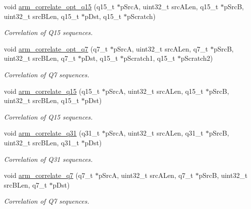 \begin{DoxyCompactItemize}
void \hyperlink{group__Corr_gad71c0ec70ec69edbc48563d9a5f68451}{arm\+\_\+correlate\+\_\+opt\+\_\+q15} (q15\+\_\+t $\ast$p\+SrcA, uint32\+\_\+t src\+A\+Len, q15\+\_\+t $\ast$p\+SrcB, uint32\+\_\+t src\+B\+Len, q15\+\_\+t $\ast$p\+Dst, q15\+\_\+t $\ast$p\+Scratch)
\begin{DoxyCompactList}\small\item\em Correlation of Q15 sequences. \end{DoxyCompactList}\item 
void \hyperlink{group__Corr_ga746e8857cafe33ec5d6780729c18c311}{arm\+\_\+correlate\+\_\+opt\+\_\+q7} (q7\+\_\+t $\ast$p\+SrcA, uint32\+\_\+t src\+A\+Len, q7\+\_\+t $\ast$p\+SrcB, uint32\+\_\+t src\+B\+Len, q7\+\_\+t $\ast$p\+Dst, q15\+\_\+t $\ast$p\+Scratch1, q15\+\_\+t $\ast$p\+Scratch2)
\begin{DoxyCompactList}\small\item\em Correlation of Q7 sequences. \end{DoxyCompactList}\item 
void \hyperlink{group__Corr_ga5ec96b8e420d68b0e626df0812274d46}{arm\+\_\+correlate\+\_\+q15} (q15\+\_\+t $\ast$p\+SrcA, uint32\+\_\+t src\+A\+Len, q15\+\_\+t $\ast$p\+SrcB, uint32\+\_\+t src\+B\+Len, q15\+\_\+t $\ast$p\+Dst)
\begin{DoxyCompactList}\small\item\em Correlation of Q15 sequences. \end{DoxyCompactList}\item 
void \hyperlink{group__Corr_ga1367dc6c80476406c951e68d7fac4e8c}{arm\+\_\+correlate\+\_\+q31} (q31\+\_\+t $\ast$p\+SrcA, uint32\+\_\+t src\+A\+Len, q31\+\_\+t $\ast$p\+SrcB, uint32\+\_\+t src\+B\+Len, q31\+\_\+t $\ast$p\+Dst)
\begin{DoxyCompactList}\small\item\em Correlation of Q31 sequences. \end{DoxyCompactList}\item 
void \hyperlink{group__Corr_ga284ddcc49e4ac532d52a70d0383c5992}{arm\+\_\+correlate\+\_\+q7} (q7\+\_\+t $\ast$p\+SrcA, uint32\+\_\+t src\+A\+Len, q7\+\_\+t $\ast$p\+SrcB, uint32\+\_\+t src\+B\+Len, q7\+\_\+t $\ast$p\+Dst)
\begin{DoxyCompactList}\small\item\em Correlation of Q7 sequences. \end{DoxyCompactList}\end{DoxyCompactItemize}


